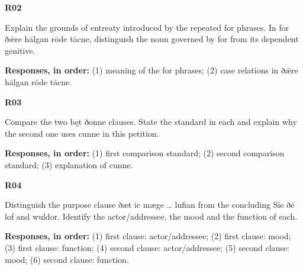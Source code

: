 \par\begin{minipage}{\linewidth}\raggedright
\textbf{R02}

Explain the grounds of entreaty introduced by the repeated for phrases. In for ðǣre hālgan rōde tācne, distinguish the noun governed by for from its dependent genitive.

\textbf{Responses, in order:} (1) meaning of the for phrases; (2) case relations in ðǣre hālgan rōde tācne.

\end{minipage}\par\addvspace{4pt}

\par\begin{minipage}{\linewidth}\raggedright
\textbf{R03}

Compare the two bęt ðonne clauses. State the standard in each and explain why the second one uses cunne in this petition.

\textbf{Responses, in order:} (1) first comparison standard; (2) second comparison standard; (3) explanation of cunne.

\end{minipage}\par\addvspace{4pt}

\par\begin{minipage}{\linewidth}\raggedright
\textbf{R04}

Distinguish the purpose clause ðæt ic mæge … lufian from the concluding Sīe ðē lof and wuldor. Identify the actor/\allowbreak{}addressee, the mood and the function of each.

\textbf{Responses, in order:} (1) first clause: actor/\allowbreak{}addressee; (2) first clause: mood; (3) first clause: function; (4) second clause: actor/\allowbreak{}addressee; (5) second clause: mood; (6) second clause: function.

\end{minipage}\par\addvspace{4pt}

